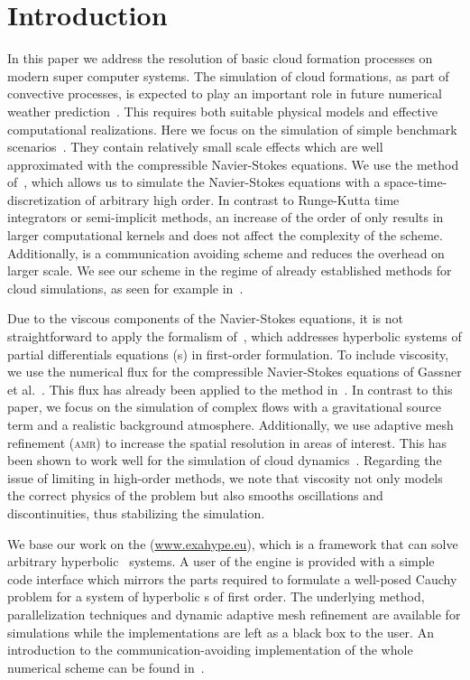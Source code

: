 \documentclass[runningheads]{llncs}
\begin{document}
\section{Introduction}
In this paper we address the resolution of basic cloud formation processes on modern super computer systems.
The simulation of cloud formations, as part of convective processes, is expected to play an important role in future numerical weather prediction~\cite{bauer2015quiet}.
This requires both suitable physical models and effective computational realizations. 
Here we focus on the simulation of simple benchmark scenarios~\cite{giraldo2008study}.
They contain relatively small scale effects which are well approximated with the compressible Navier-Stokes equations.
We use the \aderdg{} method of~\cite{dumbser2008unified}, which allows us to simulate the Navier-Stokes equations with a space-time-discretization of arbitrary high order.
In contrast to Runge-Kutta time integrators or semi-implicit methods, an increase of the order of \aderdg{} only results in larger computational kernels and does not affect the complexity of the scheme.
Additionally, \aderdg{} is a communication avoiding scheme and reduces the overhead on larger scale.
We see our scheme in the regime of already established methods for cloud simulations, as seen for example in~\cite{giraldo2008study,muller2010adaptive,muller2018strong}.

Due to the viscous components of the Navier-Stokes equations, it is not straightforward to apply the \aderdg{} formalism of~\cite{dumbser2008unified}, which addresses hyperbolic systems of partial differentials equations (\pde{}s) in first-order formulation.
To include viscosity, we use the numerical flux for the compressible Navier-Stokes equations of Gassner et al.~\cite{gassner2008discontinuous}.
This flux has already been applied to the \aderdg{} method in~\cite{dumbser2010arbitrary}.
In contrast to this paper, we focus on the simulation of complex flows with a gravitational source term and a realistic background atmosphere.
Additionally, we use adaptive mesh refinement (\textsc{amr}) to increase the spatial resolution in areas of interest.
This has been shown to work well for the simulation of cloud dynamics~\cite{muller2010adaptive}.
Regarding the issue of limiting in high-order \dg{} methods, we note that viscosity not only models the correct physics of the problem but also smooths oscillations and discontinuities, thus stabilizing the simulation.

We base our work on the \exahypeengine{} (\url{www.exahype.eu}), which is a framework that can solve arbitrary hyperbolic \pde\ systems.
A user of the engine is provided with a simple code interface which mirrors the parts required to formulate a well-posed Cauchy problem for a system of hyperbolic \pde{}s of first order.
The underlying \aderdg{} method, parallelization techniques and dynamic adaptive mesh refinement are available for simulations while the implementations are left as a black box to the user.
An introduction to the communication-avoiding implementation of the whole numerical scheme can be found in~\cite{charrier2018stop}.
\end{document}
